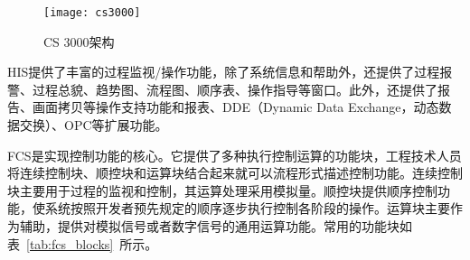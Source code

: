\begin{figure}[!htb]
\centering
\texttt{[image: cs3000]}
\caption{CS 3000架构} \label{fig:cs3000}
\end{figure}

HIS提供了丰富的过程监视/操作功能，除了系统信息和帮助外，还提供了过程报警、过程总貌、趋势图、流程图、顺序表、操作指导等窗口。此外，还提供了报告、画面拷贝等操作支持功能和报表、DDE（Dynamic Data Exchange，动态数据交换）、OPC等扩展功能。

FCS是实现控制功能的核心。它提供了多种执行控制运算的功能块，工程技术人员将连续控制块、顺控块和运算块结合起来就可以流程形式描述控制功能。连续控制块主要用于过程的监视和控制，其运算处理采用模拟量。顺控块提供顺序控制功能，使系统按照开发者预先规定的顺序逐步执行控制各阶段的操作。运算块主要作为辅助，提供对模拟信号或者数字信号的通用运算功能。常用的功能块如表~\ref{tab:fcs_blocks}~所示。

